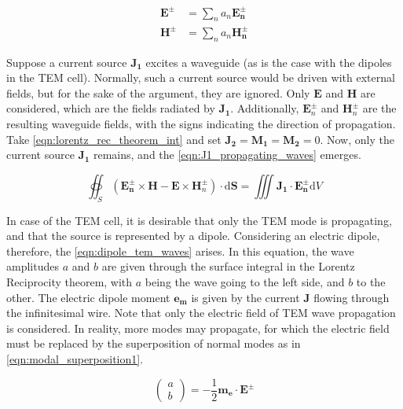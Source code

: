 \begin{align}
    \mathbf{E^\pm}&=\sum_na_n\mathbf{E_n^\pm}    \label{eqn:modal_superposition1}\\
    \mathbf{H^\pm}&=\sum_na_n\mathbf{H_n^\pm}    \label{eqn:modal_superposition2}
\end{align}

Suppose a current source $\mathbf{J_1}$ excites a waveguide (as is the case with the dipoles in the TEM cell). Normally, such a current source would be driven with external fields, but for the sake of the argument, they are ignored. Only $\mathbf{E}$ and $\mathbf{H}$ are considered, which are the fields radiated by $\mathbf{J_1}$. Additionally, $\mathbf{E}_n^\pm$ and $\mathbf{H}_n^\pm$ are the resulting waveguide fields, with the signs indicating the direction of propagation. Take \autoref{eqn:lorentz_rec_theorem_int} and set $\mathbf{J_2}=\mathbf{M_1}=\mathbf{M_2}=0$. Now, only the current source $\mathbf{J_1}$ remains, and the \autoref{eqn:J1_propagating_waves} emerges. %

\begin{equation}
    \oiint _S (\mathbf{E_n^\pm}\times \mathbf{H}-\mathbf{E}\times \mathbf{H}_n^\pm)\cdot\mathrm{d}\mathbf{S}=\iiint \mathbf{J_1}\cdot\mathbf{E_n^\pm}\mathrm{d}V
    \label{eqn:J1_propagating_waves}
\end{equation}

In case of the TEM cell, it is desirable that only the TEM mode is propagating, and that the source is represented by a dipole. Considering an electric dipole, therefore, the \autoref{eqn:dipole_tem_waves} arises. In this equation, the wave amplitudes $a$ and $b$ are given through the surface integral in the Lorentz Reciprocity theorem, with $a$ being the wave going to the left side, and $b$ to the other. The electric dipole moment $\mathbf{e_m}$ is given by the current $\mathbf{J}$ flowing through the infinitesimal wire. Note that only the electric field of TEM wave propagation is considered. In reality, more modes may propagate, for which the electric field must be replaced by the superposition of normal modes as in \autoref{eqn:modal_superposition1}. %

\begin{equation}
\begin{pmatrix}a \\b\end{pmatrix} = -\frac{1}{2}\mathbf{m_e}\cdot \mathbf{E}^\pm
\label{eqn:dipole_tem_waves}
\end{equation}

